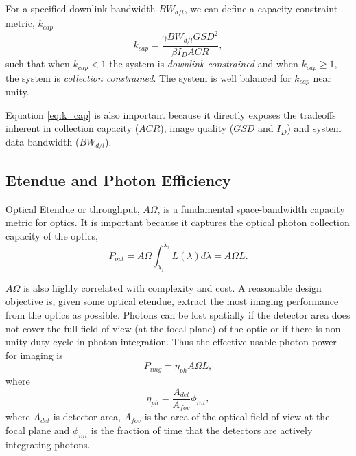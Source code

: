 \documentclass[10pt,journal]{IEEEtran}  %
\begin{document}
For a specified downlink bandwidth $BW_{d/l}$, we can define a capacity constraint metric, $k_{cap}$
\begin{equation}
\label{eq:k_cap}
k_{cap} = \frac{\gamma BW_{d/l} GSD^2}{\beta I_D ACR},
\end{equation}
such that when $k_{cap} < 1$ the system is \emph{downlink constrained} and when $k_{cap} \geq 1$, the system is \emph{collection constrained}.  The system is well balanced for $k_{cap}$ near unity.  

Equation \eqref{eq:k_cap} is also  important because it directly exposes the tradeoffs inherent in collection capacity ($ACR$), image quality ($GSD$ and $I_D$) and system data bandwidth ($BW_{d/l}$).



\subsection{Etendue and Photon Efficiency}
\label{sec:entendue}

Optical Etendue or throughput, $A \Omega$, is a fundamental space-bandwidth capacity metric for optics.  It is important because it captures the optical photon collection capacity of the optics,
\begin{equation}
    P_{opt} = A\Omega \int_{\lambda_1}^{\lambda_2}L(\lambda) d\lambda = A\Omega L.
\end{equation}

$A\Omega$ is also highly correlated with complexity and cost.  A reasonable design objective is, given some optical etendue, extract the most imaging performance from the optics as possible.
Photons can be lost spatially if the detector area does not cover the full field of view (at the focal plane) of the optic or if there is non-unity duty cycle in photon integration.  Thus the effective usable photon power for imaging is
\begin{equation}
    P_{img} = \eta_{ph} A \Omega L ,
\end{equation}
where
\begin{equation}
    \eta_{ph} = \frac{A_{det}}{A_{fov}} \phi_{int},
\end{equation}
where $A_{det}$ is detector area, $A_{fov}$ is the area of the optical field of view at the focal plane and $\phi_{int}$ is the fraction of time that the detectors are actively integrating photons.  
\end{document}
